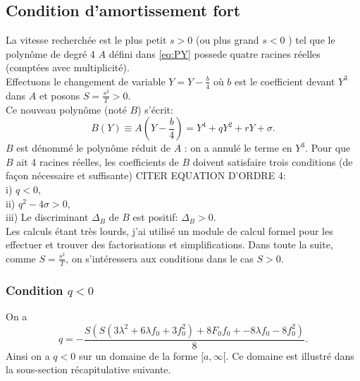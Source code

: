 \documentclass[11pt]{article}
\begin{document}
\subsection{Condition d'amortissement fort}
La vitesse recherchée est le plus petit $s>0$ (ou plus grand $s<0$ ) tel que le polynôme de degré 4 $A$ défini dans \ref{eq:PY} possede quatre racines réelles (comptées avec multiplicité).\\ 
Effectuons le changement de variable $Y= Y-\frac{b}{4}$ où $b$ est le coefficient devant $Y^3$ dans $A$ et posons $S= \frac{s^2}{T}>0$.\\
 Ce nouveau polynôme (noté $B$) s'écrit: \begin{equation}
	B(Y) \equiv A(Y-\frac{b}{4}) = Y^4 + qY^2 + r Y + \sigma.
\end{equation}
$B$ est dénommé le polynôme réduit de $A$ : on a annulé le terme en $Y^3$.
Pour que $B$ ait 4 racines réelles, les coefficients de $B$ doivent satisfaire trois conditions (de façon nécessaire et suffisante) CITER EQUATION D'ORDRE 4:\\
i) $q<0$,\\
ii) $q^2-4\sigma>0$,\\
iii) Le discriminant $\Delta_B$ de $B$ est positif: $\Delta_B>0$.\\
Les calculs étant très lourds, j'ai utilisé un module de calcul formel pour les effectuer et trouver des factorisations et simplifications. Dans toute la suite, comme $S= \frac{s^2}{T}$, on s’intéressera aux conditions dans le cas $S>0$.
\subsubsection{Condition $q<0$}
On a \begin{equation} q = - \frac{S \left( S \left(3 \lambda^{2} + 6 \lambda f_{0} + 3 f_{0}^{2}\right)+ 8 F_{0} f_{0} + - 8 \lambda f_{0} - 8 f_{0}^{2}\right)}{8}. \end{equation}
Ainsi on a $q<0$ sur un domaine de la forme $[a,\infty[$. Ce domaine est illustré dans la sous-section récapitulative suivante.

\newpage
\end{document}
